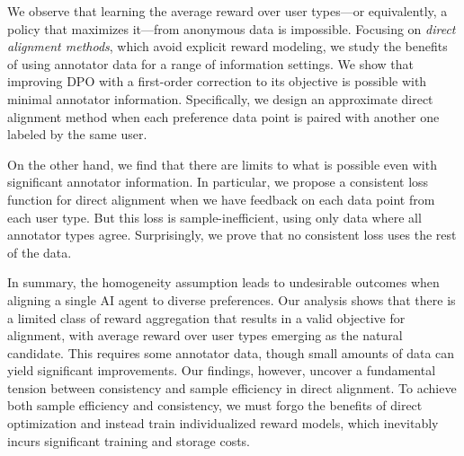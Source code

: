 We observe that learning the average reward over user types---or equivalently, a policy that maximizes it---from anonymous data is impossible. Focusing on \emph{direct alignment methods}, which avoid explicit reward modeling, we study the benefits of using annotator data for a range of information settings. We show that improving DPO with a first-order correction to its objective is possible with minimal annotator information. Specifically, we design an approximate direct alignment method when each preference data point is paired with another one labeled by the same user.

On the other hand, we find that there are limits to what is possible even with significant annotator information. In particular, we propose a consistent loss function for direct alignment when we have feedback on each data point from each user type. But this loss is sample-inefficient, using only data where all annotator types agree. Surprisingly, we prove that no consistent loss uses the rest of the data. 

In summary, the homogeneity assumption leads to undesirable outcomes when aligning a single AI agent to diverse preferences. Our analysis shows that there is a limited class of reward aggregation that results in a valid objective for alignment, with average reward over user types emerging as the natural candidate. This requires some annotator data, though small amounts of data can yield significant improvements. Our findings, however, uncover a fundamental tension between consistency and sample efficiency in direct alignment. To achieve both sample efficiency and consistency, we must forgo the benefits of direct optimization and instead train individualized reward models, which inevitably incurs significant training and storage costs. 
